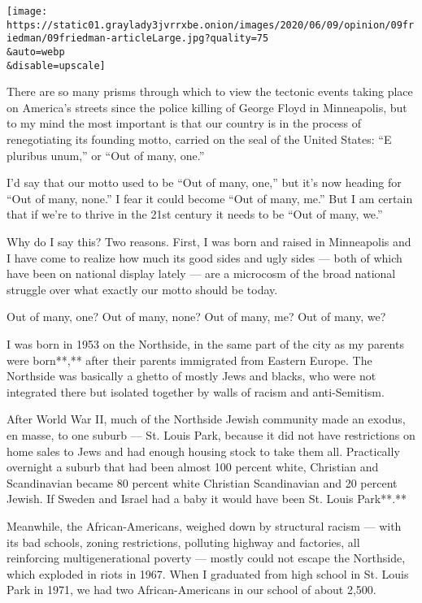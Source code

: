 \texttt{[image: https://static01.graylady3jvrrxbe.onion/images/2020/06/09/opinion/09friedman/09friedman-articleLarge.jpg?quality=75\\\&auto=webp\\\&disable=upscale]}

There are so many prisms through which to view the tectonic events
taking place on America's streets since the police killing of George
Floyd in Minneapolis, but to my mind the most important is that our
country is in the process of renegotiating its founding motto, carried
on the seal of the United States: ``E pluribus unum,'' or ``Out of many,
one.''

I'd say that our motto used to be ``Out of many, one,'' but it's now
heading for ``Out of many, none.'' I fear it could become ``Out of many,
me.'' But I am certain that if we're to thrive in the 21st century it
needs to be ``Out of many, we.''

Why do I say this? Two reasons. First, I was born and raised in
Minneapolis and I have come to realize how much its good sides and ugly
sides --- both of which have been on national display lately --- are a
microcosm of the broad national struggle over what exactly our motto
should be today.

Out of many, one? Out of many, none? Out of many, me? Out of many, we?

I was born in 1953 on the Northside, in the same part of the city as my
parents were born**,** after their parents immigrated from Eastern
Europe. The Northside was basically a ghetto of mostly Jews and blacks,
who were not integrated there but isolated together by walls of racism
and anti-Semitism.

After World War II, much of the Northside Jewish community made an
exodus, en masse, to one suburb --- St. Louis Park, because it did not
have restrictions on home sales to Jews and had enough housing stock to
take them all. Practically overnight a suburb that had been almost 100
percent white, Christian and Scandinavian became 80 percent white
Christian Scandinavian and 20 percent Jewish. If Sweden and Israel had a
baby it would have been St. Louis Park**.**

Meanwhile, the African-Americans, weighed down by structural racism ---
with its bad schools, zoning restrictions, polluting highway and
factories, all reinforcing multigenerational poverty --- mostly could
not escape the Northside, which exploded in riots in 1967. When I
graduated from high school in St. Louis Park in 1971, we had two
African-Americans in our school of about 2,500.

